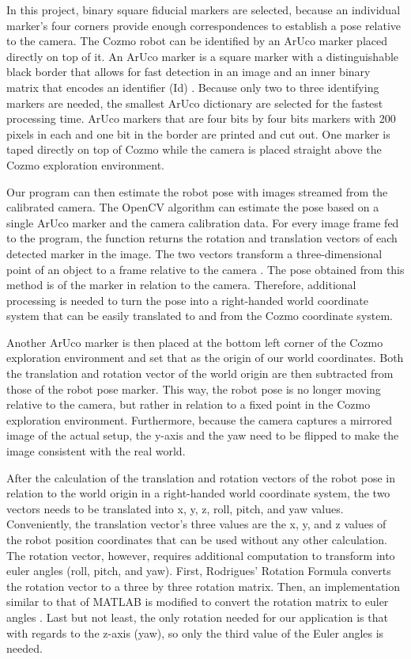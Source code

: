 \documentclass[jou,apacite]{apa6}
\begin{document}
In this project, binary square fiducial markers are selected, because an individual marker’s four corners provide enough correspondences to establish a pose relative to the camera. The Cozmo robot can be identified by an ArUco marker placed directly on top of it. An ArUco marker is a square marker with a distinguishable black border that allows for fast detection in an image and an inner binary matrix that encodes an identifier (Id) \cite{Garrido-Jurado}. Because only two to three identifying markers are needed, the smallest ArUco dictionary are selected for the fastest processing time. ArUco markers that are four bits by four bits markers with 200 pixels in each and one bit in the border are printed and cut out. One marker is taped directly on top of Cozmo while the camera is placed straight above the Cozmo exploration environment.

Our program can then estimate the robot pose with images streamed from the calibrated camera. The OpenCV algorithm can estimate the pose based on a single ArUco marker and the camera calibration data. For every image frame fed to the program, the function returns the rotation and translation vectors of each detected marker in the image. The two vectors transform a three-dimensional point of an object to a frame relative to the camera \cite{OpenCV}. The pose obtained from this method is of the marker in relation to the camera. Therefore, additional processing is needed to turn the pose into a right-handed world coordinate system that can be easily translated to and from the Cozmo coordinate system.

Another ArUco marker is then placed at the bottom left corner of the Cozmo exploration environment and set that as the origin of our world coordinates. Both the translation and rotation vector of the world origin are then subtracted from those of the robot pose marker. This way, the robot pose is no longer moving relative to the camera, but rather in relation to a fixed point in the Cozmo exploration environment. Furthermore, because the camera captures a mirrored image of the actual setup, the y-axis and the yaw need to be flipped to make the image consistent with the real world.

After the calculation of the translation and rotation vectors of the robot pose in relation to the world origin in a right-handed world coordinate system, the two vectors needs to be translated into x, y, z, roll, pitch, and yaw values. Conveniently, the translation vector’s three values are the x, y, and z values of the robot position coordinates that can be used without any other calculation. The rotation vector, however, requires additional computation to transform into euler angles (roll, pitch, and yaw). First, Rodrigues' Rotation Formula converts the rotation vector to a three by three rotation matrix. Then, an implementation similar to that of MATLAB is modified to convert the rotation matrix to euler angles \cite{Mallick}. Last but not least, the only rotation needed for our application is that with regards to the z-axis (yaw), so only the third value of the Euler angles is needed.
\end{document}
